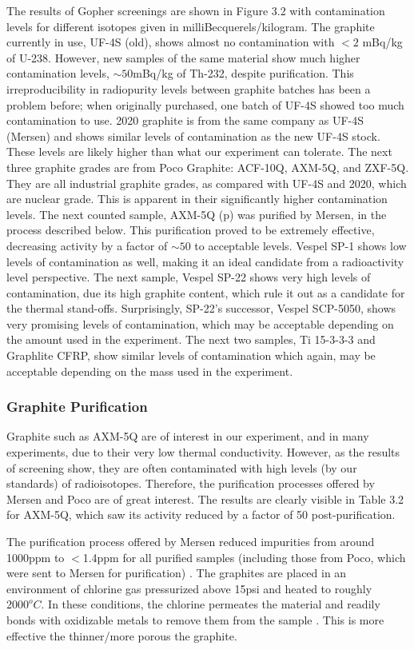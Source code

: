 \documentclass{report}
\begin{document}
The results of Gopher screenings are shown in Figure 3.2 with contamination levels for different isotopes given in milliBecquerels/kilogram. The graphite currently in use, UF-4S (old), shows almost no contamination with $<2$ mBq/kg of U-238. However, new samples of the same material show much higher contamination levels, $\sim 50$mBq/kg of Th-232, despite purification. This irreproducibility in radiopurity levels between graphite batches has been a problem before; when originally purchased, one batch of UF-4S showed too much contamination to use. 2020 graphite is from the same company as UF-4S (Mersen) and shows similar levels of contamination as the new UF-4S stock. These levels are likely higher than what our experiment can tolerate. The next three graphite grades are from Poco Graphite: ACF-10Q, AXM-5Q, and ZXF-5Q. They are all industrial graphite grades, as compared with UF-4S and 2020, which are nuclear grade. This is apparent in their significantly higher contamination levels. The next counted sample, AXM-5Q (p) was purified by Mersen, in the process described below. This purification proved to be extremely effective, decreasing activity by a factor of $\sim50$ to acceptable levels. Vespel SP-1 shows low levels of contamination as well, making it an ideal candidate from a radioactivity level perspective. The next sample, Vespel SP-22 shows very high levels of contamination, due its high graphite content, which rule it out as a candidate for the thermal stand-offs. Surprisingly, SP-22's successor, Vespel SCP-5050, shows very promising levels of contamination, which may be acceptable depending on the amount used in the experiment. The next two samples, Ti 15-3-3-3 and Graphlite CFRP, show similar levels of contamination which again, may be acceptable depending on the mass used in the experiment.

\subsubsection{Graphite Purification}
Graphite such as AXM-5Q are of interest in our experiment, and in many experiments, due to their very low thermal conductivity. However, as the results of screening show, they are often contaminated with high levels (by our standards) of radioisotopes. Therefore, the purification processes offered by Mersen and Poco are of great interest. The results are clearly visible in Table 3.2 for AXM-5Q, which saw its activity reduced by a factor of 50 post-purification.

The purification process offered by Mersen reduced impurities from around 1000ppm to $<$1.4ppm for all purified samples (including those from Poco, which were sent to Mersen for purification) \cite{Mersen_conv}. The graphites are placed in an environment of chlorine gas pressurized above 15psi and heated to roughly $2000^{o}C$. In these conditions, the chlorine permeates the material and readily bonds with oxidizable metals to remove them from the sample \cite{Olivier_conv}. This is more effective the thinner/more porous the graphite.
\end{document}

